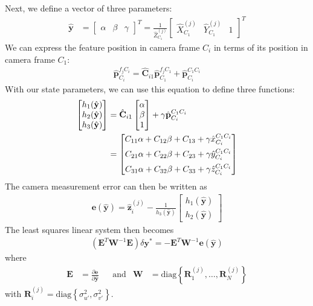 \documentclass[letterpaper, 10 pt, conference]{ieeeconf}  %
\def\Vec#1{\mathbf{#1}}
\newcommand{\bbm}{\begin{bmatrix}}
\newcommand{\ebm}{\end{bmatrix}}
\begin{document}
Next, we define a vector of three parameters:
\begin{align}
\hat{\Vec{y}} &= \bbm \alpha & \beta & \gamma \ebm^T = \frac{1}{\hat{Z}^{(j)}_{C_1}} \bbm \hat{X}^{(j)}_{C_1} & \hat{Y}^{(j)}_{C_1} & 1 \ebm ^T
\end{align}
We can express the feature position in camera frame $C_i$ in terms of its position in camera frame $C_1$:
\begin{align}
\hat{\Vec{p}}_{C_i}^{f_j C_i} = \hat{\Vec{C}}_{i1} \hat{\Vec{p}}_{C_1}^{f_j C_1}  + \hat{\Vec{p}}_{C_i}^{C_1 C_i}
\end{align}
With our state parameters, we can use this equation to define three functions:
\begin{align}
    \bbm h_1 (\hat{\Vec{y}}) \\ h_2 (\hat{\Vec{y}}) \\ h_3 (\hat{\Vec{y}}) \ebm 
    & = \hat{\Vec{C}}_{i1} \bbm \alpha \\ \beta \\ 1 \ebm + \gamma  \hat{\Vec{p}}_{C_i}^{C_1 C_i} \notag \\
    & = \bbm C_{11} \alpha + C_{12} \beta + C_{13} + \gamma \hat{x}_{C_i}^{C_1 C_i} \\[0.5em]
            C_{21} \alpha + C_{22} \beta + C_{23} + \gamma \hat{y}_{C_i}^{C_1 C_i} \\[0.5em]
            C_{31} \alpha + C_{32} \beta + C_{33} + \gamma \hat{z}_{C_i}^{C_1 C_i} 
        \ebm 
\end{align}
The camera measurement error can then be written as
\begin{align}
\Vec e(\hat{\Vec{y}}) = \hat{\Vec{z}}_i^{(j)} - \frac{1}{h_3 (\hat{\Vec{y}}) } \bbm h_1 (\hat{\Vec{y}}) \\ h_2 (\hat{\Vec{y}}) \ebm
\end{align}
The least squares linear system then becomes
\begin{align}
(\Vec  E^T \Vec W ^{-1} \Vec E ) \delta \Vec{y}^*  = - \Vec{E}^T\Vec{W}^{-1}\Vec{e}(\hat{\Vec{y}})
\end{align}
where
\begin{align}
\Vec E &= \frac{\partial \Vec e}{\partial \hat{\Vec{y}}}
& &
\text{and}
&
\Vec W &= \text{diag}\left\{ \Vec{R}_1^{(j)}, \hdots, \Vec{R}_N^{(j)} \right\}
\end{align}
with $\Vec{R}_i^{(j)} = \text{diag}\left\{\sigma^2_{u'}, \sigma^2_{v'}\right\}$.
\end{document}
